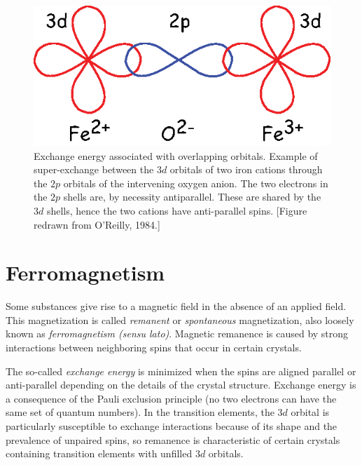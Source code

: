 {\begin{figure}[htb]
\centering  \includegraphics[width=10 cm]{EPSfiles/exchange.eps}
\caption{ Exchange energy associated with overlapping orbitals.  Example of super-exchange between the $3d$ orbitals of two iron cations through the $2p$ orbitals of the intervening oxygen anion.  The  two electrons in the $2p$ shells are, by necessity antiparallel.  These are shared by the $3d$ shells, hence the two cations have anti-parallel spins. [Figure redrawn from O'Reilly, 1984.]}
\label{fig:exchange}
\end{figure}


\section {Ferromagnetism}
\label{sect:ferro}

Some substances give rise to a magnetic field in the absence of an applied field. 
This magnetization  is called {\it remanent } or
%
 {\it spontaneous} magnetization, also   loosely known as
%
{\it ferromagnetism (sensu lato)}. 
 Magnetic remanence is caused by
strong interactions between neighboring spins that occur in certain
crystals.  

The so-called
%
{\it exchange energy} is minimized when the spins
are aligned parallel or anti-parallel depending on the details of the crystal
structure.  
Exchange energy is a consequence of the Pauli exclusion principle (no two electrons can have the same set of quantum numbers).  
In the transition elements, the $3d$ orbital is particularly 
susceptible to exchange interactions because of
its shape and the prevalence of unpaired spins, 
 so remanence is characteristic of
certain crystals containing transition elements with unfilled {$ 3d$} orbitals.  

}
